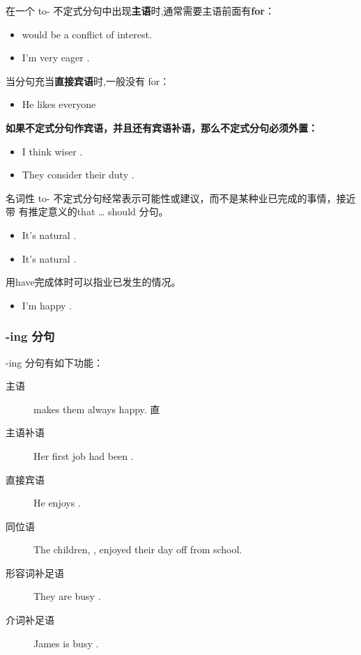 在一个 to- 不定式分句中出现\textbf{主语}时,通常需要主语前面有\textbf{for}：
\begin{itemize}
\item {} would be a conflict of interest.

\item I'm very eager .
\end{itemize}

当分句充当\textbf{直接宾语}时,一般没有 for：
\begin{itemize}
\item He likes everyone 
\end{itemize}

\textbf{如果不定式分句作宾语，并且还有宾语补语，那么不定式分句必须外置：}
\begin{itemize}
\item I think  wiser .

\item They consider  their duty .
\end{itemize}

名词性 to- 不定式分句经常表示可能性或建议，而不是某种业已完成的事情，接近带
有推定意义的that \ldots{} should 分句。
\begin{itemize}
\item It's natural .

\item It's natural .
\end{itemize}

用have完成体时可以指业已发生的情况。
\begin{itemize}
\item I'm happy .
\end{itemize}

\subsubsection{-ing 分句}

-ing 分句有如下功能：
\begin{description}
\item[主语]  makes them always happy.
  直
\item[主语补语] Her first job had been .
\item[直接宾语] He enjoys .
\item[同位语] The children, , enjoyed
  their day off from school.
\item[形容词补足语] They are busy .
\item[介词补足语] James is busy .
\end{description}


